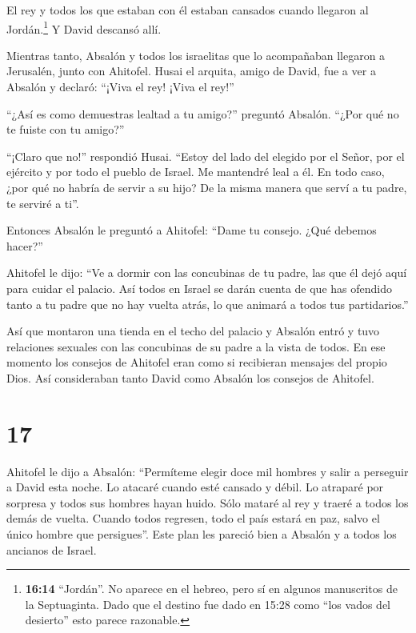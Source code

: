  El rey y todos los que estaban con él estaban cansados
cuando llegaron al Jordán.\footnote{\textbf{16:14} ``Jordán''. No
  aparece en el hebreo, pero sí en algunos manuscritos de la
  Septuaginta. Dado que el destino fue dado en 15:28 como ``los vados
  del desierto'' esto parece razonable.} Y David descansó allí.

 Mientras tanto, Absalón y todos los israelitas que lo
acompañaban llegaron a Jerusalén, junto con Ahitofel. 
Husai el arquita, amigo de David, fue a ver a Absalón y declaró: ``¡Viva
el rey! ¡Viva el rey!''

 ``¿Así es como demuestras lealtad a tu amigo?'' preguntó
Absalón. ``¿Por qué no te fuiste con tu amigo?''

 ``¡Claro que no!'' respondió Husai. ``Estoy del lado del
elegido por el Señor, por el ejército y por todo el pueblo de Israel. Me
mantendré leal a él.  En todo caso, ¿por qué no habría de
servir a su hijo? De la misma manera que serví a tu padre, te serviré a
ti''.

 Entonces Absalón le preguntó a Ahitofel: ``Dame tu
consejo. ¿Qué debemos hacer?''

 Ahitofel le dijo: ``Ve a dormir con las concubinas de tu
padre, las que él dejó aquí para cuidar el palacio. Así todos en Israel
se darán cuenta de que has ofendido tanto a tu padre que no hay vuelta
atrás, lo que animará a todos tus partidarios.''

 Así que montaron una tienda en el techo del palacio y
Absalón entró y tuvo relaciones sexuales con las concubinas de su padre
a la vista de todos.  En ese momento los consejos de
Ahitofel eran como si recibieran mensajes del propio Dios. Así
consideraban tanto David como Absalón los consejos de Ahitofel.

\hypertarget{section-16}{%
\section{17}\label{section-16}}

 Ahitofel le dijo a Absalón: ``Permíteme elegir doce mil
hombres y salir a perseguir a David esta noche.  Lo atacaré
cuando esté cansado y débil. Lo atraparé por sorpresa y todos sus
hombres hayan huido. Sólo mataré al rey  y traeré a todos
los demás de vuelta. Cuando todos regresen, todo el país estará en paz,
salvo el único hombre que persigues''.  Este plan les
pareció bien a Absalón y a todos los ancianos de Israel.

